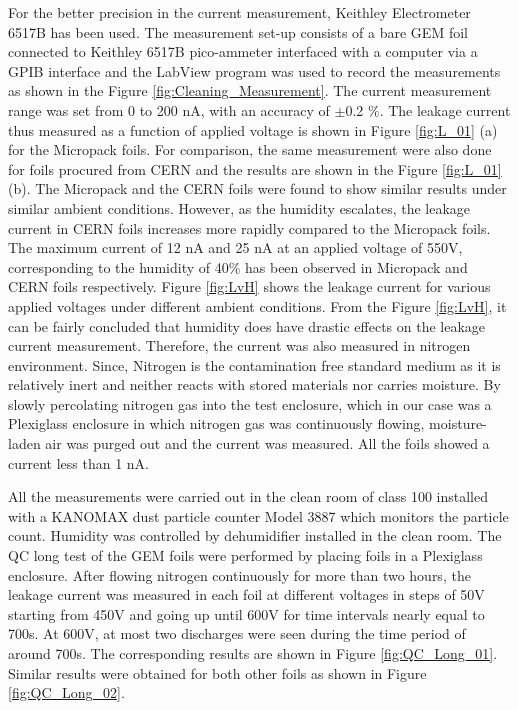 For the better precision in the current measurement, Keithley Electrometer 6517B \cite{thirteen} has been used. The measurement set-up consists of a bare GEM foil connected to Keithley 6517B pico-ammeter interfaced with a computer via a GPIB interface and the LabView program was used to record the measurements as shown in the Figure \ref{fig:Cleaning_Measurement}. The current measurement range was set from 0 to 200 nA, with an accuracy of $\pm$0.2 $\%$. The leakage current thus measured as a function of applied voltage is shown in Figure \ref{fig:L_01} (a) for the Micropack foils. For comparison, the same measurement were also done for foils procured from CERN and the results are shown in the Figure \ref{fig:L_01} (b).  
The Micropack and the CERN foils were found to show similar results under similar ambient conditions. However, as the humidity escalates, the leakage current in CERN foils increases more rapidly compared to the Micropack foils. The maximum current of 12 nA and 25 nA at an applied voltage of 550V, corresponding to the humidity of 40\% has been observed in Micropack and CERN foils respectively. Figure \ref{fig:LvH} shows the leakage current for various applied voltages under different ambient conditions. From the Figure \ref{fig:LvH}, it can be fairly concluded that humidity does have drastic effects on the leakage current measurement. Therefore, the current was also measured in nitrogen environment. Since, Nitrogen is the contamination free standard medium as it is relatively inert and neither reacts with stored materials nor carries moisture. By slowly percolating nitrogen gas into the test enclosure, which in our case was a Plexiglass enclosure in which nitrogen gas was continuously flowing, moisture-laden air was purged out and the current was measured. All the foils showed a current less than 1 nA.

All the measurements were carried out in the clean room of class 100 installed with a KANOMAX dust particle counter Model 3887 \cite{fourteen} which monitors the particle count. Humidity was controlled by dehumidifier installed in the clean room. The QC long test of the GEM foils were performed by placing foils in a Plexiglass enclosure. After flowing nitrogen continuously for more than two hours, the leakage current was measured in each foil at different voltages in steps of 50V starting from 450V and going up until 600V for time intervals nearly equal to 700s. At 600V, at most two discharges were seen during the time period of around 700s. The corresponding results are shown in Figure \ref{fig:QC_Long_01}. Similar results were obtained for both other foils as shown in Figure \ref{fig:QC_Long_02}.

